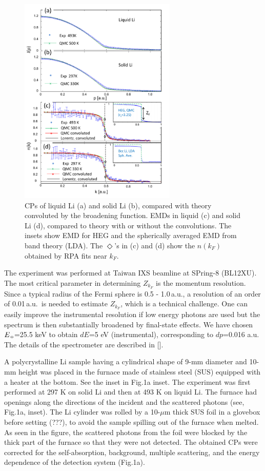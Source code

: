 \documentclass[twocolumn,showpacs,showkeys,fleqn,prl,superscriptaddress]{revtex4}%
\newcommand{\nn}[1]{\textnormal{ #1}}
\begin{document}
\begin{figure}
\includegraphics[bb= 50 10 500 720, width=7.5cm]{fig2.pdf}
\caption{CPs of liquid Li (a) and solid Li (b), compared with theory convoluted by the broadening function.  EMDs in liquid (c) and solid Li (d), compared to theory with or without the convolutions. The insets show EMD for HEG and the spherically averaged EMD from band theory (LDA). The $\Diamond$'s in (c) and (d)  show the $n(k_F)$ obtained by RPA fits near $k_F$.}
\label{Fig.2}
\end{figure}

The experiment was performed at Taiwan IXS beamline at SPring-8 (BL12XU).
The most critical parameter in determining $Z_{k_F}$ is the momentum resolution. 
Since a typical radius of the Fermi sphere is 0.5 - 1.0\,a.u., a resolution of an order of 0.01\,a.u.\, is needed to estimate $Z_{k_F}$, which is a technical challenge.
One can easily improve the instrumental resolution if low energy photons are used but the spectrum is then substantially broadened by final-state effects\cite{stern00,soi01}.
We have chosen $E_{\nn{\!o}}$=25.5 keV to obtain $dE$=5 eV (instrumental), corresponding to $dp$=0.016 a.u.
The details of the spectrometer are described in []. 


A polycrystalline Li sample having a cylindrical shape of 9-mm diameter and 10-mm height was placed in the furnace made of stainless steel (SUS) equipped with a heater at the bottom. See the inset in Fig.1a inset.
The experiment was first performed at 297 K on solid Li and then at 493 K on liquid Li. 
The furnace had openings along the directions of the incident and the scattered photons (see, Fig.1a, inset).
The Li cylinder was rolled by a 10-$\mu$m thick SUS foil in a glovebox before setting (???), to avoid the sample spilling out of the furnace when melted.
As seen in the figure, the scattered photons from the foil were blocked by the thick part of the furnace so that they were not detected.
The obtained CPs were corrected for the self-absorption, background, multiple scattering, and the energy dependence of the detection system (Fig.1a).
\end{document}
